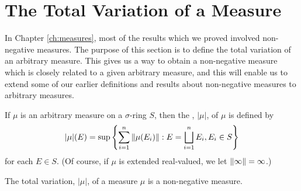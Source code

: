 \section{The Total Variation of a Measure}

In Chapter \ref{ch:measures}, most of the results which we proved involved non-negative measures. The purpose of this section is to define the total variation of an arbitrary measure. This gives us a way to obtain a non-negative measure which is closely related to a given arbitrary measure, and this will enable us to extend some of our earlier definitions and results about non-negative measures to arbitrary measures.

\begin{definition}
If $\mu$ is an arbitrary measure on a $\sigma$-ring $S$, then the , $|\mu|$, of $\mu$ is defined by $$|\mu|(E)=\sup\left\{\sum_{i=1}^n\norm{\mu(E_i)}: E=\bigsqcup_{i=1}^nE_i, E_i\in S\right\}$$ for each $E \in S$. (Of course, if $\mu$ is extended real-valued, we let $\norm{\infty}=\infty$.)
\end{definition}


\begin{theorem}
\label{thm:total var is measure}
The total variation, $|\mu|$, of a measure $\mu$ is a non-negative measure.
\end{theorem}

